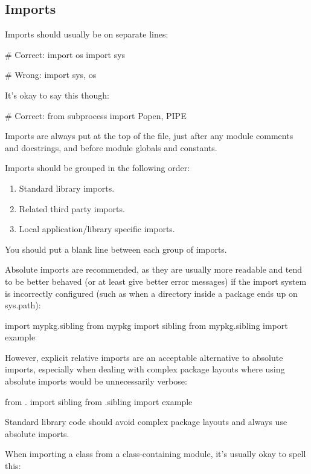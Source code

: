 \documentclass[a4paper,11pt]{article}
\begin{document}
\subsection{Imports}
Imports should usually be on separate lines:
\par
\begin{python}
# Correct:
import os
import sys
\end{python}
\begin{python}
# Wrong:
import sys, os
\end{python}
It’s okay to say this though:
\par
\begin{python}
# Correct:
from subprocess import Popen, PIPE
\end{python}
Imports are always put at the top of the file, just after any module comments
and docstrings, and before module globals and constants.
\par
Imports should be grouped in the following order:
\begin{enumerate}
\item Standard library imports.
\item Related third party imports.
\item Local application/library specific imports.
\end{enumerate}
You should put a blank line between each group of imports.
\par
Absolute imports are recommended, as they are usually more readable and tend to
be better behaved (or at least give better error messages) if the import system
is incorrectly configured (such as when a directory inside a package ends up on
sys.path):
\par
\begin{python}
import mypkg.sibling
from mypkg import sibling
from mypkg.sibling import example
\end{python}
However, explicit relative imports are an acceptable alternative to absolute
imports, especially when dealing with complex package layouts where using
absolute imports would be unnecessarily verbose:
\par
\begin{python}
from . import sibling
from .sibling import example
\end{python}
Standard library code should avoid complex package layouts and always use
absolute imports.
\par
When importing a class from a class-containing module, it’s usually okay to
spell this:
\par
\end{document}
